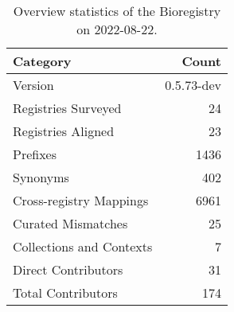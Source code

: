 \begin{table}
\centering
\caption{Overview statistics of the Bioregistry on 2022-08-22.}
\label{tab:bioregistry-summary}
\begin{tabular}{lr}
\toprule
                Category &      Count \\
\midrule
                 Version & 0.5.73-dev \\
     Registries Surveyed &         24 \\
      Registries Aligned &         23 \\
                Prefixes &       1436 \\
                Synonyms &        402 \\
 Cross-registry Mappings &       6961 \\
      Curated Mismatches &         25 \\
Collections and Contexts &          7 \\
     Direct Contributors &         31 \\
      Total Contributors &        174 \\
\bottomrule
\end{tabular}
\end{table}
